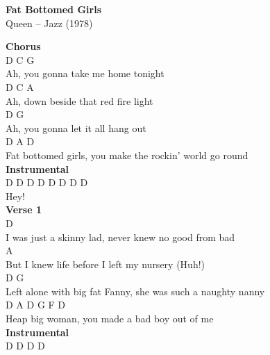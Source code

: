 \documentclass[a4paper]{article}
\begin{document}
    \begin{center}
        \textbf{Fat Bottomed Girls}
        ~\\
        Queen -- Jazz (1978)
    \end{center}
    {
        \scriptsize
        \textbf{Chorus}
        ~\\
        {
            \cutive
            \obeyspaces
D             C              G
\\
Ah, you gonna take me home tonight
\\
D          C                  A
\\
Ah, down beside that red fire light
\\
D             G
\\
Ah, you gonna let it all hang out
\\
             D                   A                D
\\
Fat bottomed girls, you make the rockin' world go round
\\

        }
        \textbf{Instrumental}
        ~\\
        {
            \cutive
            \obeyspaces
D   D   D   D   D   D   D   D
\\
                           Hey!
\\

        }
        \textbf{Verse 1}
        ~\\
        {
            \cutive
            \obeyspaces
      D
\\
I was just a skinny lad, never knew no good from bad
\\
                                      A
\\
But I knew life before I left my nursery  (Huh!)
\\
      D                                G
\\
Left alone with big fat Fanny, she was such a naughty nanny
\\
         D                 A              D    G F D
\\
Heap big woman, you made a bad boy out of me
\\

        }
        \textbf{Instrumental}
        ~\\
        {
            \cutive
            \obeyspaces
D   D   D   D   
\\

}}
\end{document}
